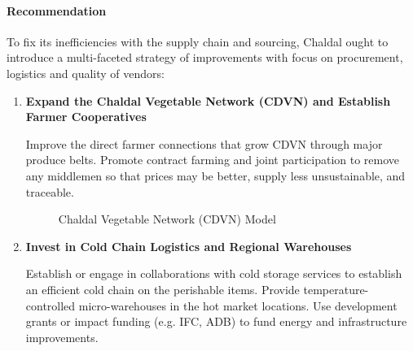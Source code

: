 \documentclass[12pt,a4paper]{article}
\begin{document}
\paragraph{Recommendation}

To fix its inefficiencies with the supply chain and sourcing, Chaldal ought to introduce a multi-faceted strategy of improvements with focus on procurement, logistics and quality of vendors:


\begin{enumerate}
    \item \textbf{Expand the Chaldal Vegetable Network (CDVN) and Establish Farmer Cooperatives}
    
    Improve the direct farmer connections that grow CDVN through major produce belts. Promote contract farming and joint participation to remove any middlemen so that prices may be better, supply less unsustainable, and traceable.

    \begin{figure}[H]
    \centering
    \caption{Chaldal Vegetable Network (CDVN) Model}
    \label{fig:cdvn-model}
\end{figure}
    \item \textbf{Invest in Cold Chain Logistics and Regional Warehouses}
    
    Establish or engage in collaborations with cold storage services to establish an efficient cold chain on the perishable items. Provide temperature-controlled micro-warehouses in the hot market locations. Use development grants or impact funding (e.g. IFC, ADB) to fund energy and infrastructure improvements.
    

\end{enumerate}
\end{document}
